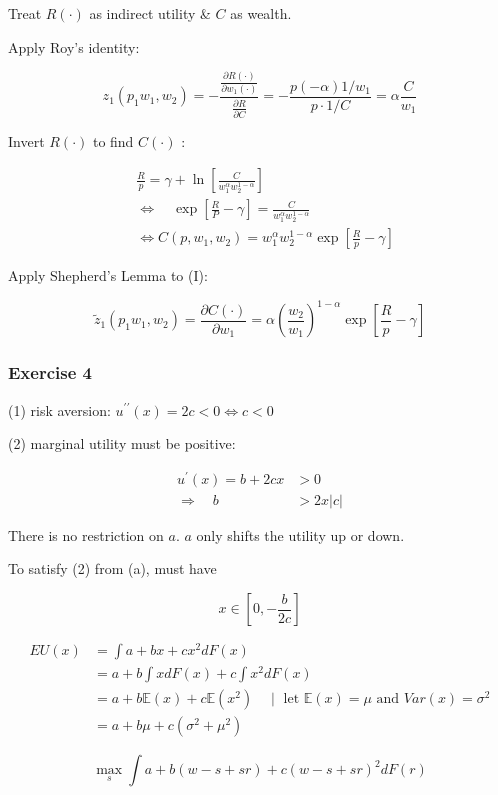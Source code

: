 {{\begin{enumerate}[label=(\alph*)]
{\item 
Treat $R(\cdot)$ as indirect utility \& $C$ as wealth.

Apply Roy's identity:

$$
z_{1}\left(p_{1} w_{1}, w_{2}\right)=-\frac{\frac{\partial R(\cdot)}{\partial w_{1}(\cdot)}}{\frac{\partial R}{\partial C}}=-\frac{p(-\alpha) 1 / w_{1}}{p \cdot 1 / C}=\alpha \frac{C}{w_{1}}
$$
}
{\item
Invert $R(\cdot)$ to find $C(\cdot)$ :

\begin{align*}
    & \frac{R}{p}=\gamma+\ln \left[\frac{C}{w_{1}^{\alpha} w_{2}^{1-\alpha}}\right] \\
    & \Leftrightarrow \quad \exp \left[\frac{R}{P}-\gamma\right]=\frac{C}{w_{1}^{\alpha} w_{2}^{1-\alpha}} \\
    & \Leftrightarrow C\left(p, w_{1}, w_{2}\right)=w_{1}^{\alpha} w_{2}^{1-\alpha} \exp \left[\frac{R}{p}-\gamma\right] \tag{I}
\end{align*}
}
{\item 
Apply Shepherd's Lemma to (I):

$$
\tilde{z}_{1}\left(p_{1} w_{1}, w_{2}\right)=\frac{\partial C(\cdot)}{\partial w_{1}}=\alpha\left(\frac{w_{2}}{w_{1}}\right)^{1-\alpha} \exp \left[\frac{R}{p}-\gamma\right]
$$
}
\end{enumerate}
}
{
\subsubsection*{Exercise 4}

\begin{enumerate}[label=(\alph*)]
{\item 
(1) risk aversion: $u^{\prime \prime}(x)=2 c<0 \Longleftrightarrow c<0$

(2) marginal utility must be positive:

$$
\begin{array}{rlrl} 
    u^{\prime}(x)=b+2 c x & >0 \\
    \Rightarrow \quad b & >2 x|c|
\end{array}
$$

There is no restriction on $a$. $a$ only shifts the utility up or down.
}
{\item 
To satisfy (2) from (a), must have

$$
x \in\left[0,-\frac{b}{2 c}\right]
$$
}
{\item 
$$
\begin{aligned}
E U(x) & =\int a+b x+c x^{2} d F(x) \\
& =a+b \int x d F(x)+c \int x^{2} d F(x) \\
& =a+b \mathbb{E}(x)+c \mathbb{E}\left(x^{2}\right) \quad \mid \text { let } \mathbb{E}(x)=\mu \text{ and } Var(x) = \sigma^2\\
& =a+b \mu+c\left(\sigma^{2}+\mu^{2}\right)
\end{aligned}
$$
}
{\item 
$$
\max _{s} \int a+b(w-s+s r)+c(w-s+s r)^{2} d F(r)
$$

}
\end{enumerate}}}
